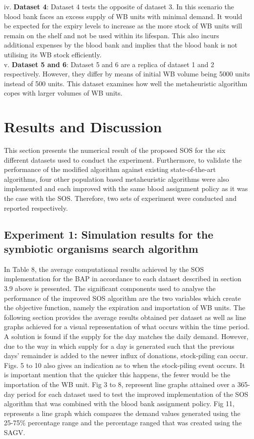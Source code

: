 \documentclass{article}
\begin{document}
iv.	\textbf{Dataset 4}: Dataset 4 tests the opposite of dataset 3. In this scenario the blood bank faces an excess supply of WB units with minimal demand. It would be expected for the expiry levels to increase as the more stock of WB units will remain on the shelf and not be used within its lifespan. This also incurs additional expenses by the blood bank and implies that the blood bank is not utilising its WB stock efficiently.\\
v.	\textbf{Dataset 5 and 6}: Dataset 5 and 6 are a replica of dataset 1 and 2 respectively. However, they differ by means of initial WB volume being 5000 units instead of 500 units. This dataset examines how well the metaheuristic algorithm copes with larger volumes of WB units. \\

\section{Results and Discussion}
This section presents the numerical result of the proposed SOS for the six different datasets used to conduct the experiment. Furthermore, to validate the performance of the modified algorithm against existing state-of-the-art algorithms, four other population based metaheuristic algorithms were also implemented and each improved with the same blood assignment policy as it was the case with the SOS. Therefore, two sets of experiment were conducted and reported respectively.

\subsection{Experiment 1: Simulation results for the symbiotic organisms search algorithm}
In Table 8, the average computational results achieved by the SOS implementation for the BAP in accordance to each dataset described in section 3.9 above is presented. The significant components used to analyse the performance of the improved SOS algorithm are the two variables which create the objective function, namely the expiration and importation of WB units. The following section provides the average results obtained per dataset as well as line graphs achieved for a visual representation of what occurs within the time period. A solution is found if the supply for the day matches the daily demand. However, due to the way in which supply for a day is generated such that the previous days’ remainder is added to the newer influx of donations, stock-piling can occur. Figs. 5 to 10 also gives an indication as to when the stock-piling event occurs. It is important mention that the quicker this happens, the fewer would be the importation of the WB unit. Fig 3 to 8, represent line graphs attained over a 365-day period for each dataset used to test the improved implementation of the SOS algorithm that was combined with the blood bank assignment policy. Fig 11, represents a line graph which compares the demand values generated using the 25-75\% percentage range and the percentage ranged that was created using the SAGV.
\end{document}
